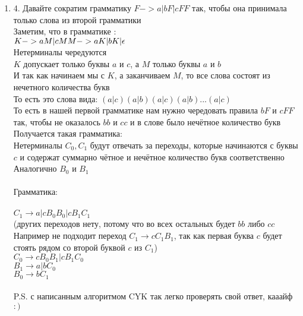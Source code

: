 \documentclass[12pt]{article}
\newenvironment{MyList}[1][4pt]{
  \begin{enumerate}[1.]
  \setlength{\parskip}{0pt}
  \setlength{\itemsep}{#1}
}{       
  \end{enumerate}
}
\begin{document}
\begin{MyList}[8pt]
 \item [4.] Давайте сократим грамматику $F -> a | bF | cFF$ так, чтобы она принимала только слова из второй грамматики \\
 Заметим, что в грамматике : \\
 $K -> aM | cM \\ M -> aK | bK | \epsilon$ \\
 Нетерминалы чередуются\\ $K$ допускает только буквы $a$ и $c$, а $M$ только буквы $a$ и $b$ \\
 И так как начинаем мы с $K$, а заканчиваем $M$, то все слова состоят из нечетного количества букв \\
 То есть это слова вида: $(a|c)(a|b)(a|c)(a|b)...(a|c)$ \\ 
 То есть в нашей первой грамматике нам нужно чередовать правила $bF$ и $cFF$ так, чтобы не оказалось $bb$ и $cc$ и в слове было нечётное количество букв\\
 Получается такая грамматика: \\
 \newpage
 Нетерминалы $C_0, C_1$ будут отвечать за переходы, которые начинаются с буквы $c$ и содержат суммарно чётное и нечётное количество букв соответственно \\
 Аналогично $B_0$ и $B_1$ \\  
 \\
 Грамматика: \\
 \\
 $C_1 \to a | cB_0B_0 | cB_1C_1$ \\
 (других переходов нету, потому что во всех остальных будет $bb$ либо $cc$ \\
 Например не подходит переход $C_1 \to cC_1B_1$, так как первая буква $c$ будет стоять рядом со второй буквой $c$ из $C_1$) \\
 $C_0 \to cB_0B_1 | cB_1C_0$ \\
 $B_1 \to a | bC_0$ \\
 $B_0 \to bC_1$ \\
 \\
 P.S. с написанным алгоритмом CYK так легко проверять свой ответ, кааайф $:)$
 
 
  
\end{MyList}
\end{document}
